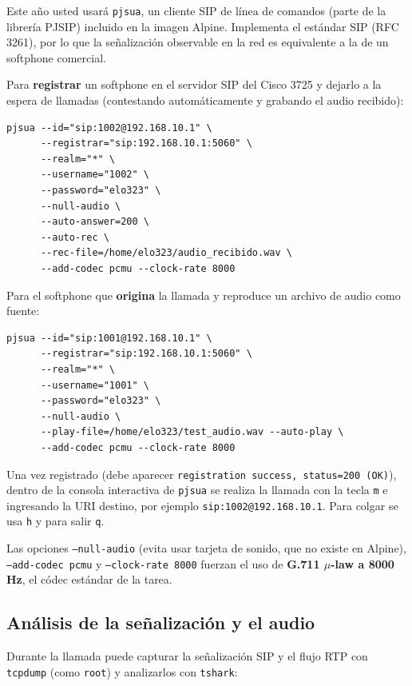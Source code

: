 \documentclass[letterpaper,12pt]{article}
\begin{document}
Este año usted usará \texttt{pjsua}, un cliente SIP de línea de comandos (parte de la librería PJSIP) incluido en la imagen Alpine. Implementa el estándar SIP (RFC 3261), por lo que la señalización observable en la red es equivalente a la de un softphone comercial.

Para \textbf{registrar} un softphone en el servidor SIP del Cisco 3725 y dejarlo a la espera de llamadas (contestando automáticamente y grabando el audio recibido):

\begin{lstlisting}
pjsua --id="sip:1002@192.168.10.1" \
      --registrar="sip:192.168.10.1:5060" \
      --realm="*" \
      --username="1002" \
      --password="elo323" \
      --null-audio \
      --auto-answer=200 \
      --auto-rec \
      --rec-file=/home/elo323/audio_recibido.wav \
      --add-codec pcmu --clock-rate 8000
\end{lstlisting}

Para el softphone que \textbf{origina} la llamada y reproduce un archivo de audio como fuente:

\begin{lstlisting}
pjsua --id="sip:1001@192.168.10.1" \
      --registrar="sip:192.168.10.1:5060" \
      --realm="*" \
      --username="1001" \
      --password="elo323" \
      --null-audio \
      --play-file=/home/elo323/test_audio.wav --auto-play \
      --add-codec pcmu --clock-rate 8000
\end{lstlisting}

Una vez registrado (debe aparecer \texttt{registration success, status=200 (OK)}), dentro de la consola interactiva de \texttt{pjsua} se realiza la llamada con la tecla \texttt{m} e ingresando la URI destino, por ejemplo \texttt{sip:1002@192.168.10.1}. Para colgar se usa \texttt{h} y para salir \texttt{q}.

\begin{nota}
Las opciones \texttt{--null-audio} (evita usar tarjeta de sonido, que no existe en Alpine), \texttt{--add-codec pcmu} y \texttt{--clock-rate 8000} fuerzan el uso de \textbf{G.711 $\mu$-law a 8000 Hz}, el códec estándar de la tarea.
\end{nota}

\subsection{Análisis de la señalización y el audio}

Durante la llamada puede capturar la señalización SIP y el flujo RTP con \texttt{tcpdump} (como \texttt{root}) y analizarlos con \texttt{tshark}:
\end{document}
